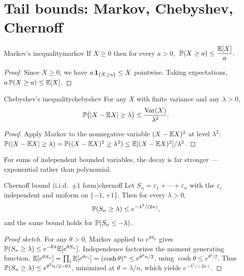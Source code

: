 \section{Tail bounds: Markov, Chebyshev, Chernoff}

\begin{theorem}{Markov's inequality}{markov}
If $X\ge0$ then for every $a>0$, $\;\mathbb{P}(X\ge a)\le\dfrac{\mathbb{E}[X]}{a}.$
\end{theorem}

\begin{proof}
Since $X\ge0$, we have $a\,\mathbf{1}_{\{X\ge a\}}\le X$ pointwise. Taking
expectations, $a\,\mathbb{P}(X\ge a)\le\mathbb{E}[X]$.
\end{proof}

\begin{theorem}{Chebyshev's inequality}{chebyshev}
For any $X$ with finite variance and any $\lambda>0$,
\[
  \mathbb{P}\bigl(|X-\mathbb{E} X|\ge\lambda\bigr)\le\frac{\operatorname{Var}(X)}{\lambda^2}.
\]
\end{theorem}

\begin{proof}
Apply Markov to the nonnegative variable $(X-\mathbb{E} X)^2$ at level $\lambda^2$:
$\mathbb{P}(|X-\mathbb{E} X|\ge\lambda)=\mathbb{P}((X-\mathbb{E} X)^2\ge\lambda^2)\le\mathbb{E}[(X-\mathbb{E} X)^2]/\lambda^2$.
\end{proof}

For sums of independent bounded variables, the decay is far stronger ---
exponential rather than polynomial.

\begin{theorem}{Chernoff bound (i.i.d.\ $\pm1$ form)}{chernoff}
Let $S_n=\varepsilon_1+\cdots+\varepsilon_n$ with the $\varepsilon_i$
independent and uniform on $\{-1,+1\}$. Then for every $\lambda>0$,
\[
  \mathbb{P}(S_n\ge\lambda)\le e^{-\lambda^2/(2n)},
\]
and the same bound holds for $\mathbb{P}(S_n\le-\lambda)$.
\end{theorem}

\begin{proof}[Proof sketch]
For any $\theta>0$, Markov applied to $e^{\theta S_n}$ gives
$\mathbb{P}(S_n\ge\lambda)\le e^{-\theta\lambda}\mathbb{E}[e^{\theta S_n}]$. Independence
factorizes the moment generating function,
$\mathbb{E}[e^{\theta S_n}]=\prod_i\mathbb{E}[e^{\theta\varepsilon_i}]=(\cosh\theta)^n
\le e^{\theta^2 n/2}$, using $\cosh\theta\le e^{\theta^2/2}$. Thus
$\mathbb{P}(S_n\ge\lambda)\le e^{\theta^2n/2-\theta\lambda}$, minimized at
$\theta=\lambda/n$, which yields $e^{-\lambda^2/(2n)}$.
\end{proof}

